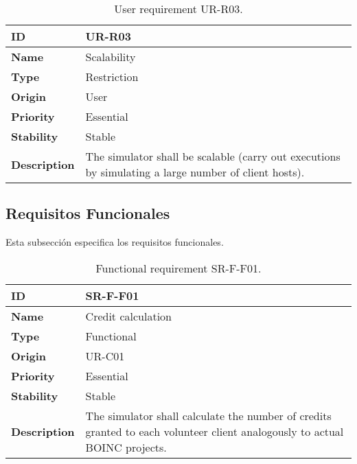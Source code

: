 \begin{center}
\begin{table*}[htbp]
\centering
\begin{tabular}{@{}p{2.5cm} p{9cm}@{}} 
\toprule
\textbf{ID} 				& UR-R03\\
\midrule
\textbf{Name} 			& Scalability \\
\midrule
\textbf{Type} 			& Restriction \\
\midrule
\textbf{Origin} 			& User \\
\midrule
\textbf{Priority}		& Essential \\
\midrule
\textbf{Stability} 		& Stable \\
\midrule
\textbf{Description} 	& The simulator shall be scalable (carry out executions by simulating a large number of client hosts). \\
\bottomrule
\end{tabular}
\caption{User requirement UR-R03.}
\label{tab:urr03}
\end{table*}
\end{center}

\fi

\clearpage
\subsection{Requisitos Funcionales}

Esta subsección especifica los requisitos funcionales.

\begin{center}
\begin{table*}[htbp]
\centering
\begin{tabular}{@{}p{2.5cm} p{9cm}@{}} 
\toprule
\textbf{ID} 				& SR-F-F01\\
\midrule
\textbf{Name} 			& Credit calculation \\
\midrule
\textbf{Type} 			& Functional \\
\midrule
\textbf{Origin} 			& UR-C01 \\
\midrule
\textbf{Priority}		& Essential \\
\midrule
\textbf{Stability} 		& Stable \\
\midrule
\textbf{Description} 	& The simulator shall calculate the number of credits granted to each volunteer client analogously to actual BOINC projects. \\
\bottomrule
\end{tabular}
\caption{Functional requirement SR-F-F01.}
\label{tab:srff01}
\end{table*}
\end{center}

